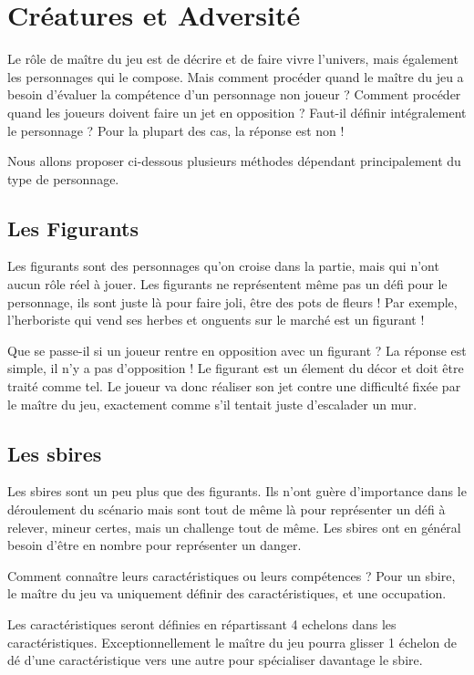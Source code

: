 \section{Créatures et Adversité}

Le rôle de maître du jeu est de décrire et de faire vivre l'univers, mais également les personnages qui le compose. Mais comment procéder quand le maître du jeu a besoin d'évaluer la compétence d'un personnage non joueur ? Comment procéder quand les joueurs doivent faire un jet en opposition ? Faut-il définir intégralement le personnage ? Pour la plupart des cas, la réponse est non ! 

Nous allons proposer ci-dessous plusieurs méthodes dépendant principalement du type de personnage.

\subsection{Les Figurants}

Les figurants sont des personnages qu'on croise dans la partie, mais qui n'ont aucun rôle réel à jouer. Les figurants ne représentent même pas un défi pour le personnage, ils sont juste là pour faire joli, être des pots de fleurs ! Par exemple, l'herboriste qui vend ses herbes et onguents sur le marché est un figurant !

Que se passe-il si un joueur rentre en opposition avec un figurant ? La réponse est simple, il n'y a pas d'opposition ! Le figurant est un élement du décor et doit être traité comme tel. Le joueur va donc réaliser son jet contre une difficulté fixée par le maître du jeu, exactement comme s'il tentait juste d'escalader un mur.

\subsection{Les sbires}

Les sbires sont un peu plus que des figurants. Ils n'ont guère d'importance dans le déroulement du scénario mais sont tout de même là pour représenter un défi à relever, mineur certes, mais un challenge tout de même. Les sbires ont en général besoin d'être en nombre pour représenter un danger.

Comment connaître leurs caractéristiques ou leurs compétences ? Pour un sbire, le maître du jeu va uniquement définir des caractéristiques, et une occupation. 

Les caractéristiques seront définies en répartissant 4 echelons dans les caractéristiques. Exceptionnellement le maître du jeu pourra glisser 1 échelon de dé d'une caractéristique vers une autre pour spécialiser davantage le sbire. 

